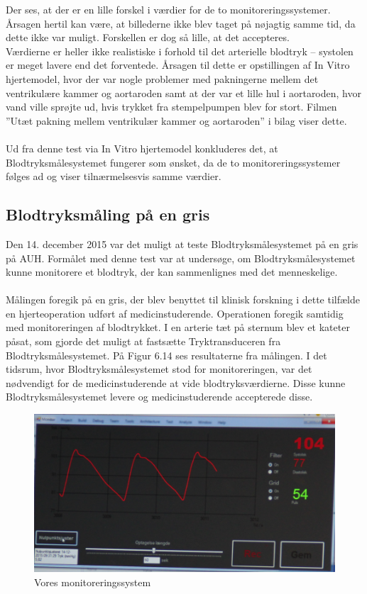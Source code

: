 Der ses, at der er en lille forskel i værdier for de to monitoreringssystemer. Årsagen hertil kan være, at billederne ikke blev taget på nøjagtig samme tid, da dette ikke var muligt. Forskellen er dog så lille, at det accepteres.\\
Værdierne er heller ikke realistiske i forhold til det arterielle blodtryk – systolen er meget lavere end det forventede. Årsagen til dette er opstillingen af In Vitro hjertemodel, hvor der var nogle problemer med pakningerne mellem det ventrikulære kammer og aortaroden samt at der var et lille hul i aortaroden, hvor vand ville sprøjte ud, hvis trykket fra stempelpumpen blev for stort.  Filmen ”Utæt pakning mellem ventrikulær kammer og aortaroden” i bilag viser dette.
\\\\
Ud fra denne test via In Vitro hjertemodel konkluderes det, at Blodtryksmålesystemet fungerer som ønsket, da de to monitoreringssystemer følges ad og viser tilnærmelsesvis samme værdier.

\subsection{Blodtryksmåling på en gris} 
Den 14. december 2015 var det muligt at teste Blodtryksmålesystemet på en gris på AUH. Formålet med denne test var at undersøge, om Blodtryksmålesystemet kunne monitorere et blodtryk, der kan sammenlignes med det menneskelige. \\\\
Målingen foregik på en gris, der blev benyttet til klinisk forskning i dette tilfælde en hjerteoperation udført af medicinstuderende. Operationen foregik samtidig med monitoreringen af blodtrykket. I en arterie tæt på sternum blev et kateter påsat, som gjorde det muligt at fastsætte Tryktransduceren fra Blodtryksmålesystemet. På Figur 6.14 ses resultaterne fra målingen. I det tidsrum, hvor Blodtryksmålesystemet stod for monitoreringen, var det nødvendigt for de medicinstuderende at vide blodtryksværdierne. Disse kunne Blodtryksmålesystemet levere og medicinstuderende accepterede disse.

\begin{figure}[H]
	\centering
	\includegraphics[width=1\textwidth]{Figurer/Snip20151214_101}
	\caption{Vores monitoreringssystem}
\end{figure}

